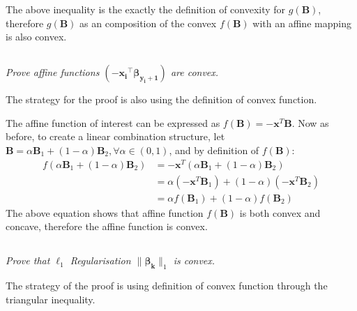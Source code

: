 \documentclass[12pt]{article}
\numberwithin{equation}{section}
\theoremstyle{remark}
\newcommand{\vect}[1]{\boldsymbol{#1}}
\newcommand{\norm}[2]{\|#1\|_{#2}}
\begin{document}
The above inequality is the exactly the definition of convexity for $g(\vect{B})$, therefore $g(\vect{B})$ as an composition of the convex $f(\vect{B})$ with an affine mapping is also convex.

\subsection{}
\textit{Prove affine functions $\left( - \vect{x_i}^{\top} \vect{\beta_{y_i + 1}} \right)$ are convex.}

\medskip
The strategy for the proof is also using the definition of convex function.

\medskip
The affine function of interest can be expressed as $f(\vect{B}) = - \vect{x}^{T}\vect{B}$. Now as before, to create a linear combination structure, let $\vect{B} = \alpha\vect{B}_{1} + (1-\alpha)\vect{B}_{2}, \forall \alpha \in (0, 1)$, and by definition of $f(\vect{B})$:
\begin{align}
f\left(\alpha \vect{B}_{1} + (1 - \alpha )\vect{B}_{2} \right) &= - \vect{x}^{T}\left(\alpha \vect{B}_{1} + (1 - \alpha )\vect{B}_{2}\right) \\
&= \alpha \left(- \vect{x}^{T}\vect{B}_{1}\right) + (1 - \alpha)\left(- \vect{x}^{T}\vect{B}_{2}\right) \\
&= \alpha f(\vect{B}_{1}) + (1 - \alpha)f(\vect{B}_{2})
\end{align}
The above equation shows that affine function $f(\vect{B})$ is both convex and concave, therefore the affine function is convex.

\subsection{}
\textit{Prove that $\ell_1$ Regularisation $\norm{\vect{\beta_k}}{1}$ is convex.}

\medskip
The strategy of the proof is using definition of convex function through the triangular inequality.
\end{document}

